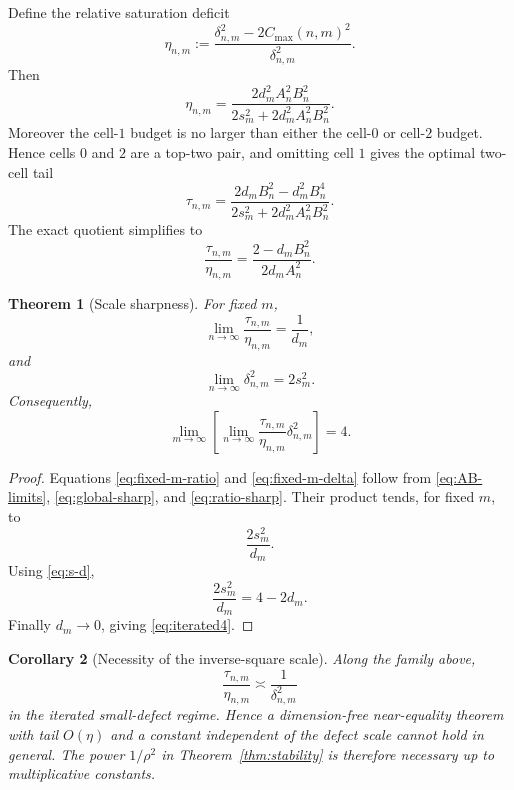 \documentclass[11pt]{article}
\newtheorem{theorem}{Theorem}[section]
\newtheorem{corollary}[theorem]{Corollary}
\newcommand{\cmax}{C_{\max}}
\newcommand{\dd}{\delta}
\newcommand{\etaq}{\eta}
\newcommand{\tauq}{\tau}
\begin{document}
Define the relative saturation deficit
\[
  \etaq_{n,m}
  :=
  \frac{\dd_{n,m}^2-2\cmax(n,m)^2}{\dd_{n,m}^2}.
\]
Then
\begin{equation}\label{eq:eta-sharp}
  \boxed{
  \etaq_{n,m}
  =
  \frac{
    2d_m^2A_n^2B_n^2
  }{
    2s_m^2+2d_m^2A_n^2B_n^2
  }.
  }
\end{equation}
Moreover the cell-$1$ budget is no larger than either the cell-$0$ or
cell-$2$ budget.  Hence cells $0$ and $2$ are a top-two pair, and omitting
cell $1$ gives the optimal two-cell tail
\begin{equation}\label{eq:tau-sharp}
  \tauq_{n,m}
  =
  \frac{
    2d_mB_n^2-d_m^2B_n^4
  }{
    2s_m^2+2d_m^2A_n^2B_n^2
  }.
\end{equation}
The exact quotient simplifies to
\begin{equation}\label{eq:ratio-sharp}
  \boxed{
  \frac{\tauq_{n,m}}{\etaq_{n,m}}
  =
  \frac{2-d_mB_n^2}{2d_mA_n^2}.
  }
\end{equation}

\begin{theorem}[Scale sharpness]\label{thm:scale-sharp}
For fixed $m$,
\begin{equation}\label{eq:fixed-m-ratio}
  \lim_{n\to\infty}
  \frac{\tauq_{n,m}}{\etaq_{n,m}}
  =
  \frac1{d_m},
\end{equation}
and
\begin{equation}\label{eq:fixed-m-delta}
  \lim_{n\to\infty}\dd_{n,m}^2=2s_m^2.
\end{equation}
Consequently,
\begin{equation}\label{eq:iterated4}
  \boxed{
  \lim_{m\to\infty}
  \left[
    \lim_{n\to\infty}
    \frac{\tauq_{n,m}}{\etaq_{n,m}}
    \dd_{n,m}^2
  \right]
  =4.
  }
\end{equation}
\end{theorem}

\begin{proof}
Equations \eqref{eq:fixed-m-ratio} and \eqref{eq:fixed-m-delta} follow from
\eqref{eq:AB-limits}, \eqref{eq:global-sharp}, and
\eqref{eq:ratio-sharp}.  Their product tends, for fixed $m$, to
\[
  \frac{2s_m^2}{d_m}.
\]
Using \eqref{eq:s-d},
\[
  \frac{2s_m^2}{d_m}
  =
  4-2d_m.
\]
Finally $d_m\to0$, giving \eqref{eq:iterated4}.
\end{proof}

\begin{corollary}[Necessity of the inverse-square scale]
Along the family above,
\[
  \frac{\tauq_{n,m}}{\etaq_{n,m}}
  \asymp \frac{1}{\dd_{n,m}^2}
\]
in the iterated small-defect regime.  Hence a dimension-free near-equality
theorem with tail $O(\etaq)$ and a constant independent of the defect scale
cannot hold in general.  The power $1/\rho^2$ in
Theorem~\ref{thm:stability} is therefore necessary up to multiplicative
constants.
\end{corollary}
\end{document}
